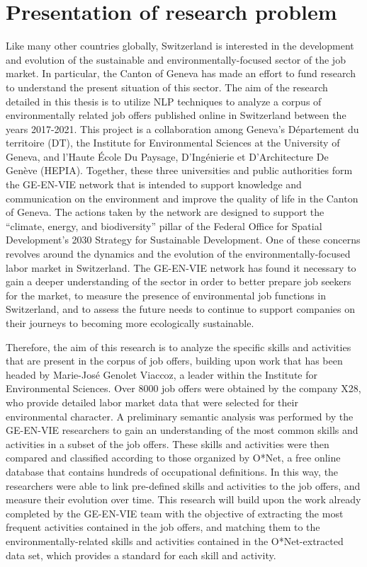 \chapter{Presentation of research problem}
\label{chap:procedure}

Like many other countries globally, Switzerland is interested in the development and evolution of the sustainable and environmentally-focused sector of the job market. In particular, the Canton of Geneva has made an effort to fund research to understand the present situation of this sector.  The aim of the research detailed in this thesis is to utilize NLP techniques to analyze a corpus of environmentally related job offers published online in Switzerland between the years 2017-2021. This project is a collaboration among Geneva’s Département du territoire (DT), the Institute for Environmental Sciences at the University of Geneva, and l'Haute \'Ecole Du Paysage, D'Ing\'enierie et D'Architecture De Gen\`eve (HEPIA). Together, these three universities and public authorities form the GE-EN-VIE network that is intended to support knowledge and communication on the environment and improve the quality of life in the Canton of Geneva. The actions taken by the network are designed to support the ``climate, energy, and biodiversity'' pillar of the Federal Office for Spatial Development’s 2030 Strategy for Sustainable Development. One of these concerns revolves around the dynamics and the evolution of the environmentally-focused labor market in Switzerland. The GE-EN-VIE network has found it necessary to gain a deeper understanding of the sector in order to better prepare job seekers for the market, to measure the presence of environmental job functions in Switzerland, and to assess the future needs to continue to support companies on their journeys to becoming more ecologically sustainable.

	Therefore, the aim  of this research is to analyze the specific skills and activities that are present in the corpus of job offers, building upon work that has been headed by Marie-José Genolet Viaccoz, a leader within the Institute for Environmental Sciences. Over 8000 job offers were obtained by the company X28, who provide detailed labor market data that were selected for their environmental character. A preliminary semantic analysis was performed by the GE-EN-VIE researchers to gain an understanding of the most common skills and activities in a subset of the job offers. These skills and activities were then compared and classified according to those organized by O*Net, a free online database that contains hundreds of occupational definitions. In this way, the researchers were able to link pre-defined skills and activities to the job offers, and measure their evolution over time. This research will build upon the work already completed by the GE-EN-VIE team with the objective of extracting the most frequent activities contained in the job offers, and matching them to the environmentally-related skills and activities contained in the O*Net-extracted data set, which provides a standard for each skill and activity.
